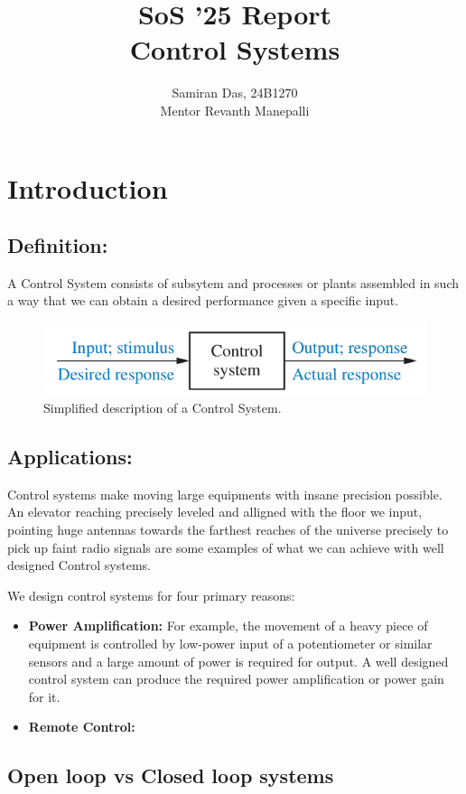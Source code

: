 \documentclass{report}
\author{Samiran Das, 24B1270\\
Mentor \- Revanth Manepalli}
\title{SoS '25 Report\\
Control Systems}
\begin{document}
\maketitle

\chapter{Introduction}

\section{Definition:}
A Control System consists of subsytem and processes or plants assembled 
in such a way that we can obtain a desired performance given a specific input.

\begin{figure}[htbp]
    \centering
    \includegraphics[scale=0.5]{images/cs_simple_bd.png}
    \caption{Simplified description of a Control System.}
\end{figure}

\section{Applications:}
Control systems make moving large equipments with insane precision possible.
An elevator reaching precisely leveled and alligned with the floor we input,
pointing huge antennas towards the farthest reaches of the universe precisely
to pick up faint radio signals are some examples of what we can achieve with well designed Control systems.
\par
We design control systems for four primary reasons:
\begin{itemize}
    \item \textbf{Power Amplification:} For example, the movement of a heavy piece of equipment is
    controlled by low-power input of a potentiometer or similar sensors and a large amount of power
    is required for output. A well designed control system can produce the required power amplification
    or power gain for it.
    \item \textbf{Remote Control:} 
\end{itemize}


\section{Open loop vs Closed loop systems}
\end{document}
